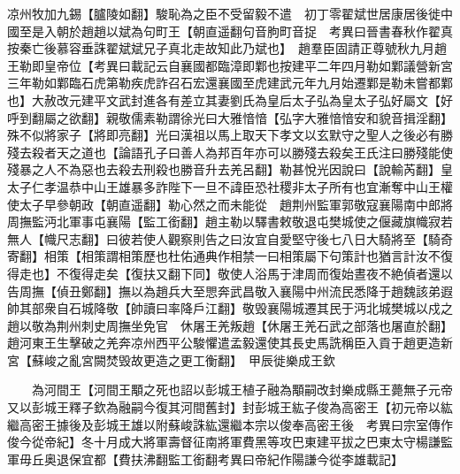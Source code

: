 凉州牧加九錫【臚陵如翻】駿恥為之臣不受留毅不遣　初丁零翟斌世居康居後徙中國至是入朝於趙趙以斌為句町王【朝直遥翻句音胊町音捉　考異曰晉書春秋作翟真按秦亡後慕容垂誅翟斌斌兄子真北走故知此乃斌也】　趙羣臣固請正尊號秋九月趙王勒即皇帝位【考異曰載記云自襄國都臨漳即鄴也按建平二年四月勒如鄴議營新宮三年勒如鄴臨石虎第勒疾虎詐召石宏還襄國至虎建武元年九月始遷鄴是勒未嘗都鄴也】大赦改元建平文武封進各有差立其妻劉氏為皇后太子弘為皇太子弘好屬文【好呼到翻屬之欲翻】親敬儒素勒謂徐光曰大雅愔愔【弘字大雅愔愔安和貌音揖淫翻】殊不似將家子【將即亮翻】光曰漢祖以馬上取天下孝文以玄默守之聖人之後必有勝殘去殺者天之道也【論語孔子曰善人為邦百年亦可以勝殘去殺矣王氏注曰勝殘能使殘暴之人不為惡也去殺去刑殺也勝音升去羌呂翻】勒甚悅光因說曰【說輸芮翻】皇太子仁孝温恭中山王雄暴多詐陛下一旦不諱臣恐社稷非太子所有也宜漸奪中山王權使太子早參朝政【朝直遥翻】勒心然之而未能從　趙荆州監軍郭敬寇襄陽南中郎將周撫監沔北軍事屯襄陽【監工銜翻】趙主勒以驛書敕敬退屯樊城使之偃藏旗幟寂若無人【幟尺志翻】曰彼若使人觀察則告之曰汝宜自愛堅守後七八日大騎將至【騎奇寄翻】相策【相策謂相策歷也杜佑通典作相禁一曰相策屬下句策計也猶言計汝不復得走也】不復得走矣【復扶又翻下同】敬使人浴馬于津周而復始晝夜不絶偵者還以告周撫【偵丑鄭翻】撫以為趙兵大至愳奔武昌敬入襄陽中州流民悉降于趙魏該弟遐帥其部衆自石城降敬【帥讀曰率降戶江翻】敬毁襄陽城遷其民于沔北城樊城以戍之趙以敬為荆州刺史周撫坐免官　休屠王羌叛趙【休屠王羌石武之部落也屠直於翻】趙河東王生擊破之羌奔凉州西平公駿懼遣孟毅還使其長史馬詵稱臣入貢于趙更造新宮【蘇峻之亂宮闕焚毁故更造之更工衡翻】　甲辰徙樂成王欽

　　為河間王【河間王顒之死也詔以彭城王植子融為顒嗣改封樂成縣王薨無子元帝又以彭城王釋子欽為融嗣今復其河間舊封】封彭城王紘子俊為高密王【初元帝以紘繼高密王據後及彭城王雄以附蘇峻誅紘還繼本宗以俊奉高密王後　考異曰宗室傳作俊今從帝紀】冬十月成大將軍壽督征南將軍費黑等攻巴東建平拔之巴東太守楊謙監軍毋丘奥退保宜都【費扶沸翻監工銜翻考異曰帝紀作陽謙今從李雄載記】


